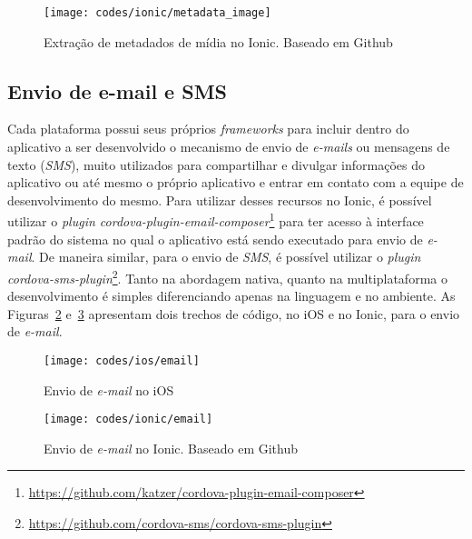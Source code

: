 \begin{figure}[H]
	\centering
	\texttt{[image: codes/ionic/metadata\_image]}
	\caption[Extração de metadados de mídia no Ionic]{Extração de metadados de mídia no Ionic. Baseado em Github\protect\footnotemark}
	\label{fig:metadata_image-ionic}
\end{figure}

\subsection{Envio de e-mail e SMS} \label{subsec:emailsms}
Cada plataforma possui seus próprios \textit{frameworks} para incluir dentro do aplicativo a ser desenvolvido o mecanismo de envio de \textit{e-mails} ou mensagens de texto (\textit{SMS}), muito utilizados para compartilhar 
e divulgar informações do aplicativo ou até mesmo o próprio aplicativo e entrar em contato com a equipe de desenvolvimento do mesmo. Para utilizar desses recursos no Ionic, é possível utilizar o 
\textit{plugin cordova-plugin-email-composer}\footnote{\url{https://github.com/katzer/cordova-plugin-email-composer}} para ter acesso à interface padrão do sistema no qual o aplicativo está sendo executado para envio de 
\textit{e-mail}. De maneira similar, para o envio de \textit{SMS}, é possível utilizar o \textit{plugin cordova-sms-plugin}\footnote{\url{https://github.com/cordova-sms/cordova-sms-plugin}}. Tanto na abordagem nativa, 
quanto na multiplataforma o desenvolvimento é simples diferenciando apenas na linguagem e no ambiente. As Figuras~\ref{fig:email-ios} e~\ref{fig:email-ionic} apresentam dois trechos de código, no iOS e no Ionic, 
para o envio de \textit{e-mail}.
\begin{figure}[H]
	\centering
	\texttt{[image: codes/ios/email]}
	\caption[Envio de \textit{e-mail} no iOS]{Envio de \textit{e-mail} no iOS}
	\label{fig:email-ios}
\end{figure}
\begin{figure}[H]
	\centering
	\texttt{[image: codes/ionic/email]}
	\caption[Envio de \textit{e-mail} no Ionic]{Envio de \textit{e-mail} no Ionic. Baseado em Github\protect\footnotemark}
	\label{fig:email-ionic}
\end{figure}

